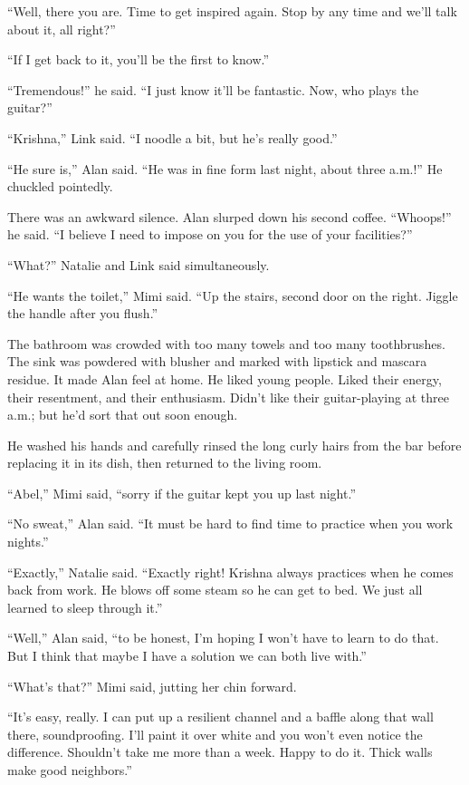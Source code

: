 \documentclass{article}
\begin{document}
``Well, there you are.  Time to get inspired again.  Stop by any time
and we'll talk about it, all right?''

``If I get back to it, you'll be the first to know.''

``Tremendous!'' he said.  ``I just know it'll be fantastic.  Now, who
plays the guitar?''

``Krishna,'' Link said.  ``I noodle a bit, but he's really good.''

``He sure is,'' Alan said.  ``He was in fine form last night, about
three a.m.!'' He chuckled pointedly.

There was an awkward silence.  Alan slurped down his second coffee. 
``Whoops!'' he said.  ``I believe I need to impose on you for the use
of your facilities?''

``What?'' Natalie and Link said simultaneously.

``He wants the toilet,'' Mimi said.  ``Up the stairs, second door on
the right.  Jiggle the handle after you flush.''

The bathroom was crowded with too many towels and too many
toothbrushes.  The sink was powdered with blusher and marked with
lipstick and mascara residue.  It made Alan feel at home.  He liked
young people.  Liked their energy, their resentment, and their
enthusiasm.  Didn't like their guitar-playing at three a.m.; but he'd
sort that out soon enough.

He washed his hands and carefully rinsed the long curly hairs from the
bar before replacing it in its dish, then returned to the living room.

``Abel,'' Mimi said, ``sorry if the guitar kept you up last night.''

``No sweat,'' Alan said.  ``It must be hard to find time to practice
when you work nights.''

``Exactly,'' Natalie said.  ``Exactly right!  Krishna always practices
when he comes back from work.  He blows off some steam so he can get
to bed.  We just all learned to sleep through it.''

``Well,'' Alan said, ``to be honest, I'm hoping I won't have to learn
to do that.  But I think that maybe I have a solution we can both live
with.''

``What's that?'' Mimi said, jutting her chin forward.

``It's easy, really.  I can put up a resilient channel and a baffle
along that wall there, soundproofing.  I'll paint it over white and
you won't even notice the difference.  Shouldn't take me more than a
week.  Happy to do it.  Thick walls make good neighbors.''
\end{document}
